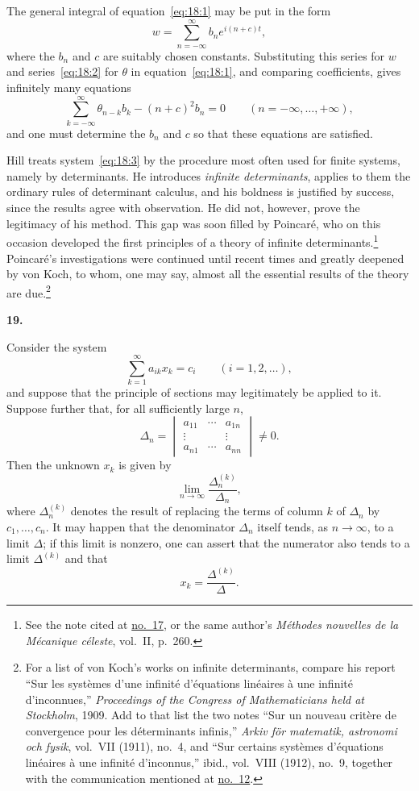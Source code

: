 \documentclass[
  paper=b5,
  fontsize=13pt,
  twoside=true,
  open=any,
  bookmarkpackage=false,
  chapterprefix=true,
  headings=normal
]{scrbook}
\theoremstyle{definition}
\newcommand{\numberedparagraph}[1]{%
  \par\medskip\phantomsection\label{sec:#1}%
  \noindent\textbf{#1.}\enspace
}
\begin{document}
The general integral of equation~\eqref{eq:18:1} may be put in the form
\[
  w=\sum_{n=-\infty}^{\infty}b_ne^{i(n+c)t},
\]
where the $b_n$ and $c$ are suitably chosen constants. Substituting this series for $w$ and series~\eqref{eq:18:2} for $\theta$ in equation~\eqref{eq:18:1}, and comparing coefficients, gives infinitely many equations
\begin{equation}
  \sum_{k=-\infty}^{\infty}\theta_{n-k}b_k-(n+c)^2b_n=0
  \qquad(n=-\infty,\ldots,+\infty),
  \tag{3}\label{eq:18:3}
\end{equation}
and one must determine the $b_n$ and $c$ so that these equations are satisfied.

Hill treats system~\eqref{eq:18:3} by the procedure most often used for finite systems, namely by determinants. He introduces \emph{infinite determinants}, applies to them the ordinary rules of determinant calculus, and his boldness is justified by success, since the results agree with observation. He did not, however, prove the legitimacy of his method. This gap was soon filled by Poincar\'e, who on this occasion developed the first principles of a theory of infinite determinants.\footnote{See the note cited at \hyperref[sec:17]{no.~17}, or the same author's \emph{M\'ethodes nouvelles de la M\'ecanique c\'eleste}, vol.~II, p.~260.} Poincar\'e's investigations were continued until recent times and greatly deepened by von Koch, to whom, one may say, almost all the essential results of the theory are due.\footnote{For a list of von Koch's works on infinite determinants, compare his report ``Sur les syst\`emes d'une infinit\'e d'\'equations lin\'eaires \`a une infinit\'e d'inconnues,'' \emph{Proceedings of the Congress of Mathematicians held at Stockholm}, 1909. Add to that list the two notes ``Sur un nouveau crit\`ere de convergence pour les d\'eterminants infinis,'' \emph{Arkiv f\"or matematik, astronomi och fysik}, vol.~VII (1911), no.~4, and ``Sur certains syst\`emes d'\'equations lin\'eaires \`a une infinit\'e d'inconnus,'' ibid., vol.~VIII (1912), no.~9, together with the communication mentioned at \hyperref[sec:12]{no.~12}.}

\numberedparagraph{19}
Consider the system
\begin{equation}
  \sum_{k=1}^{\infty}a_{ik}x_k=c_i
  \qquad(i=1,2,\ldots),
  \tag{4}\label{eq:19:4}
\end{equation}
and suppose that the principle of sections may legitimately be applied to it. Suppose further that, for all sufficiently large $n$,
\[
  \Delta_n=
  \begin{vmatrix}
    a_{11}&\cdots&a_{1n}\\
    \vdots&&\vdots\\
    a_{n1}&\cdots&a_{nn}
  \end{vmatrix}\ne0.
\]
Then the unknown $x_k$ is given by
\[
  \lim_{n\to\infty}\frac{\Delta_n^{(k)}}{\Delta_n},
\]
where $\Delta_n^{(k)}$ denotes the result of replacing the terms of column $k$ of $\Delta_n$ by $c_1,\ldots,c_n$. It may happen that the denominator $\Delta_n$ itself tends, as $n\to\infty$, to a limit $\Delta$; if this limit is nonzero, one can assert that the numerator also tends to a limit $\Delta^{(k)}$ and that
\[
  x_k=\frac{\Delta^{(k)}}{\Delta}.
\]
\end{document}
